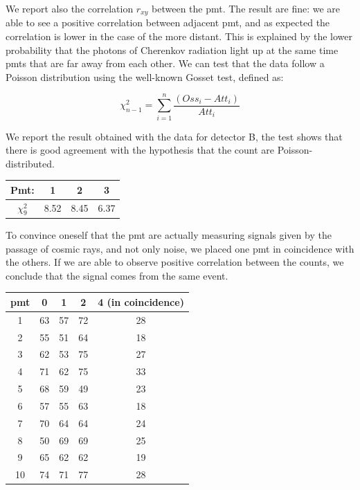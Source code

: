 We report also the correlation $r_{xy}$ between the pmt. The result are fine: we are able to see a positive correlation between adjacent pmt, and as expected the correlation is lower in the case of the more distant. This is explained by the lower probability that the photons of Cherenkov radiation light up at the same time pmts that are far away from each other.
We can test that the data follow a Poisson distribution using the well-known Gosset test, defined as:

\begin{equation}
\chi^{2}_{n-1} = \sum_{i = 1}^{n} \dfrac{(Oss_{i} - Att_{i})}{Att_{i}}
\end{equation}

We report the result obtained with the data for detector B, the test shows that there is good agreement with the hypothesis that the count are Poisson-distributed.

\begingroup
\setlength{\tabcolsep}{8pt} %
\renewcommand{\arraystretch}{1.2} %
\begin{center}
\begin{tabular}{|c|c|c|c|}
\hline 
Pmt: & 1 & 2 & 3 \\ 
\hline
$\chi^{2}_{9}$ & 8.52 & 8.45 & 6.37 \\ 
\hline
\end{tabular} 
\end{center}
\endgroup

To convince oneself that the pmt are actually measuring signals given by the passage of cosmic rays, and not only noise, we placed one pmt in coincidence with the others. If we are able to observe positive correlation between the counts, we conclude that the signal comes from the same event.

\begin{center}
\begin{tabular}{|c|c|c|c|c|}
\hline 
pmt & 0 & 1 & 2 & 4 (in coincidence) \\ 
\hline 
1 & 63 & 57 & 72 & 28 \\ 
\hline 
2 & 55 & 51 & 64 & 18 \\ 
\hline 
3 & 62 & 53 & 75 & 27 \\ 
\hline 
4 & 71 & 62 & 75 & 33 \\ 
\hline 
5 & 68 & 59 & 49 & 23 \\ 
\hline 
6 & 57 & 55 & 63 & 18 \\ 
\hline 
7 & 70 & 64 & 64 & 24 \\ 
\hline 
8 & 50 & 69 & 69 & 25 \\ 
\hline 
9 & 65 & 62 & 62 & 19 \\ 
\hline 
10 & 74 & 71 & 77 & 28 \\ 
\hline 
\end{tabular} 
\end{center} 

